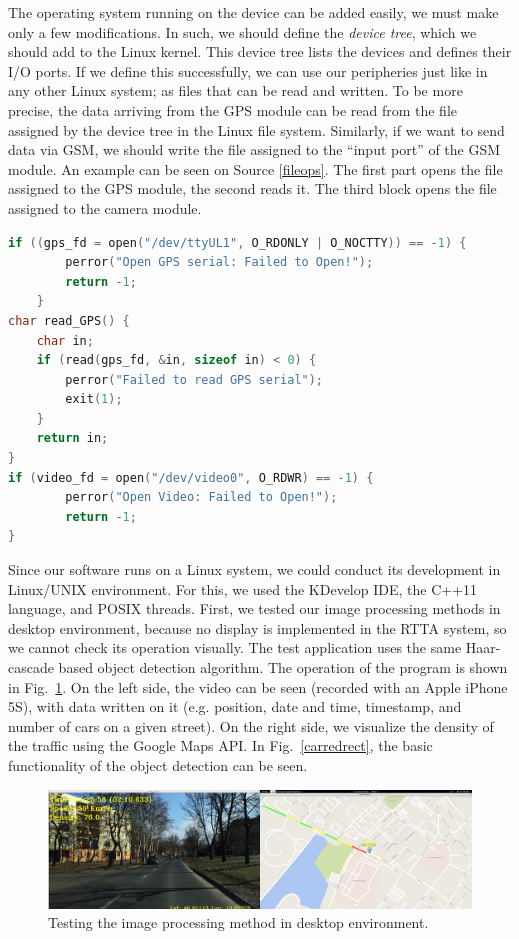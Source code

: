 \documentclass[b5paper,12pt]{report}
\theoremstyle{definition}
\begin{document}
The operating system running on the device can be added easily, we must make only a few modifications. In such, we should define the \textit{device tree}, which we should add to the Linux kernel. This device tree lists the devices and defines their I/O ports. If we define this successfully, we can use our peripheries just like in any other Linux system; as files that can be read and written. To be more precise, the data arriving from the GPS module can be read from the file assigned by the device tree in the Linux file system. Similarly, if we want to send data via GSM, we should write the file assigned to the \enquote{input port} of the GSM module. An example can be seen on Source \ref{fileops}. The first part opens the file assigned to the GPS module, the second reads it. The third block opens the file assigned to the camera module.

\begin{lstlisting}[language=C,caption=File operations in the software., label=fileops]
if ((gps_fd = open("/dev/ttyUL1", O_RDONLY | O_NOCTTY)) == -1) {
        perror("Open GPS serial: Failed to Open!");
        return -1;
    }
char read_GPS() {
    char in;
    if (read(gps_fd, &in, sizeof in) < 0) {
        perror("Failed to read GPS serial");
        exit(1);
    }
    return in;
}
if (video_fd = open("/dev/video0", O_RDWR) == -1) {
        perror("Open Video: Failed to Open!");
        return -1;
}
\end{lstlisting}

Since our software runs on a Linux system, we could conduct its development in Linux/UNIX environment. For this, we used the KDevelop IDE, the C++11 language, and POSIX threads. First, we tested our image processing methods in desktop environment, because no display is implemented in the RTTA system, so we cannot check its operation visually. The test application uses the same Haar-cascade based object detection algorithm. The operation of the program is shown in Fig.~\ref{rttapc}. On the left side, the video can be seen (recorded with an Apple iPhone 5S), with data written on it (e.g. position, date and time, timestamp, and number of cars on a given street). On the right side, we visualize the density of the traffic using the Google Maps API. In Fig.~\ref{carredrect}, the basic functionality of the object detection can be seen.

\begin{figure}[ht]
\centerline{
\includegraphics[width=12.6cm]{img/rttapc.png}}
\caption{Testing the image processing method in desktop environment.}
\label{rttapc}
\end{figure}
\end{document}
